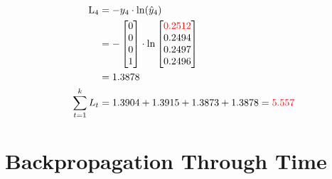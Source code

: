 \documentclass{article}
\begin{document}
\begin{align*}
    \text{L}_{4} & = -y_4 \cdot \ln(\hat{y}_4) \\
    &=-\begin{bmatrix} 0 \\ 0 \\ 0 \\ 1 \end{bmatrix} \cdot \ln{\begin{bmatrix}\textcolor{red}{0.2512} \\
0.2494 \\
0.2497 \\
0.2496
\end{bmatrix}} \\
    &=1.3878 \\
    \sum_{t=1}^k L_t & = 1.3904 + 1.3915 + 1.3873 + 1.3878 = \textcolor{red}{5.557}
\end{align*}

\section{Backpropagation Through Time}
\end{document}
